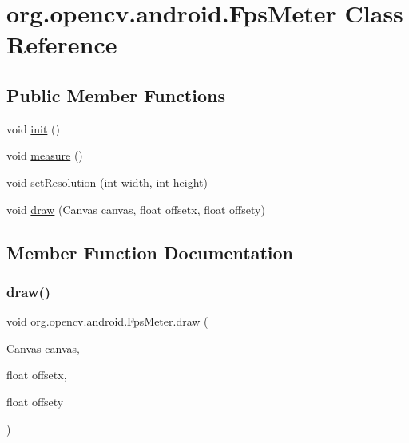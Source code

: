 \hypertarget{classorg_1_1opencv_1_1android_1_1_fps_meter}{}\section{org.\+opencv.\+android.\+Fps\+Meter Class Reference}
\label{classorg_1_1opencv_1_1android_1_1_fps_meter}
\subsection*{Public Member Functions}
\begin{DoxyCompactItemize}
\item 
void \mbox{\hyperlink{classorg_1_1opencv_1_1android_1_1_fps_meter_ac36e7d25af25ce92e24b29ad0e531491}{init}} ()
\item 
void \mbox{\hyperlink{classorg_1_1opencv_1_1android_1_1_fps_meter_a842c91516384a129c84dcd5b31b9c768}{measure}} ()
\item 
void \mbox{\hyperlink{classorg_1_1opencv_1_1android_1_1_fps_meter_a8da761141b426ba32050cb98b808adff}{set\+Resolution}} (int width, int height)
\item 
void \mbox{\hyperlink{classorg_1_1opencv_1_1android_1_1_fps_meter_a61e65eacaf894c092df0dff7f0a36e70}{draw}} (Canvas canvas, float offsetx, float offsety)
\end{DoxyCompactItemize}


\subsection{Member Function Documentation}
\mbox{\label{classorg_1_1opencv_1_1android_1_1_fps_meter_a61e65eacaf894c092df0dff7f0a36e70}} 
\subsubsection{\texorpdfstring{draw()}{draw()}}
{\footnotesize\ttfamily void org.\+opencv.\+android.\+Fps\+Meter.\+draw (\begin{DoxyParamCaption}\item[{Canvas}]{canvas,  }\item[{float}]{offsetx,  }\item[{float}]{offsety }\end{DoxyParamCaption})}

